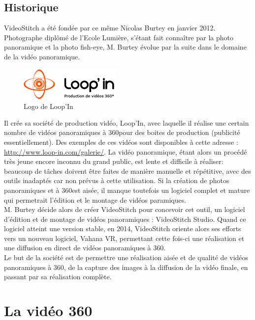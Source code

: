 \subsection{Historique}
VideoStitch a été fondée par ce même Nicolas Burtey en janvier 2012.\\
Photographe diplômé de l'Ecole Lumière, s'étant fait connaître par la photo panoramique 
et la photo fish-eye, M. Burtey évolue par la suite dans le domaine de la vidéo panoramique.\\
\begin{figure}
  \centering
  \includegraphics[width=5cm]{images/loopin-logo.png}
  \caption{Logo de Loop'In}
\end{figure}
Il crée sa société de production vidéo, Loop'In, avec laquelle il réalise une 
certain nombre de vidéos panoramiques à 360\degree pour des boites de production (publicité essentiellement). 
Des exemples de ces vidéos sont disponibles à cette adresse : \url{http://www.loop-in.com/galerie/}.
La vidéo panoramique, étant alors un procédé très jeune encore inconnu du grand public, est 
lente et difficile à réaliser: beaucoup de tâches doivent être faites de manière 
manuelle et répétitive, avec des outils inadaptés car non prévus à cette utilisation.
Si la création de photos panoramiques et à 360\degree est aisée, il manque toutefois 
un logiciel complet et mature qui permetrait l'édition et le montage de vidéos paramiques.\\
\newline
M. Burtey décide alors de créer VideoStitch pour concevoir cet outil, un logiciel 
d'édition et de montage de vidéos panoramiques : VideoStitch Studio.
Quand ce logiciel atteint une version stable, en 2014, VideoStitch oriente alors 
ses efforts vers un nouveau logiciel, Vahana VR, permettant cette fois-ci une réalisation 
et une diffusion en direct de vidéos panoramiques à 360\degree.\\
Le but de la société est de permettre une réalisation aisée et de qualité de vidéos 
panoramiques à 360\degree, de la capture des images à la diffusion de la vidéo finale, 
en passant par sa réalisation complète.


\section{La vidéo 360}
